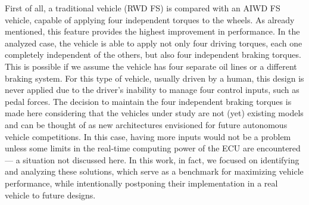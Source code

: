 First of all, a traditional vehicle (RWD FS) is compared with an AIWD FS vehicle, capable of applying four independent torques to the wheels. As already mentioned, this feature provides the highest improvement in performance. In the analyzed case, the vehicle is able to apply not only four driving torques, each one completely independent of the others, but also four independent braking torques. This is possible if we assume the vehicle has four separate oil lines or a different braking system. For this type of vehicle, usually driven by a human, this design is never applied due to the driver's inability to manage four control inputs, such as pedal forces. The decision to maintain the four independent braking torques is made here considering that the vehicles under study are not (yet) existing models and can be thought of as new architectures envisioned for future autonomous vehicle competitions. In this case, having more inputs would not be a problem unless some limits in the real-time computing power of the ECU are encountered --- a situation not discussed here. In this work, in fact, we focused on identifying and analyzing these solutions, which serve as a benchmark for maximizing vehicle performance, while intentionally postponing their implementation in a real vehicle to future designs.

